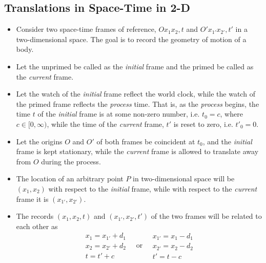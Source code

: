 \documentclass[11pt]{article}
\begin{document}
\subsection*{Translations in Space-Time in 2-D}
\label{sec:org0a7c86d}
\begin{itemize}
\item Consider two space-time frames of reference, \(Ox_1x_2,t\) and \(O'x_{1'}x_{2'},t'\) in a two-dimensional space. The goal is to record the geometry of motion of a body.

\item Let the unprimed be called as the \emph{initial} frame and the primed be called as the \emph{current} frame.
\item Let the watch of the \emph{initial} frame reflect the world clock, while the watch of the primed frame reflects the \emph{process} time. That is, as the \emph{process} begins, the time \(t\) of the \emph{initial} frame is at some non-zero number, i.e. \(t_0 = c\), where \(c \in [0,\infty)\), while the time of the  \emph{current} frame, \(t'\) is reset to zero, i.e. \(t'_0 = 0\).
\item Let the origins \(O\) and \(O'\) of both frames be coincident at \(t_0\), and the \emph{initial} frame is kept stationary, while the \emph{current} frame is allowed to translate away from \(O\) during the process.
\item The location of an arbitrary point \(P\) in two-dimensional space will be \((x_1,x_2)\) with respect to the \emph{initial} frame, while with respect to the \emph{current} frame it is \((x_{1'},x_{2'})\).
\item The records \((x_1,x_2,t)\) and \((x_{1'},x_{2'},t')\) of the two frames will be related to each other as
$$ \begin{array}{c} x_1 = x_{1'} + d_1 \\ x_2 = x_{2'} + d_2 \\ t = t' + c \end{array} \quad \mathrm{or} \quad \begin{array}{c} x_{1'} = x_1 - d_1 \\ x_{2'} = x_2 - d_2 \\ t' = t - c \end{array} $$
\end{itemize}
\end{document}
